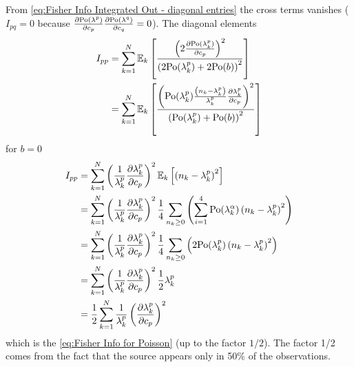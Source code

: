 From \autoref{eq:Fisher Info Integrated Out - diagonal entries} the cross terms vanishes ($I_{pq}=0$ because $\frac{\partial\mathrm{Po}(\lambda^p)}{\partial c_p}\frac{\partial\mathrm{Po}(\lambda^q)}{\partial c_{q}}=0$). The diagonal elements 
%
\begin{alignat*}{1}
	I_{pp} & =\sum_{k=1}^N\mathbb{E}_k\left[\frac{\left(2\frac{\partial\mathrm{Po}(\lambda_k^p)}{\partial c_p}\right)^2}{\left(2\mathrm{Po}(\lambda_k^p)+2\mathrm{Po}(b)\right)^2}\right]\\
 	& =\sum_{k=1}^N\mathbb{E}_k\left[\frac{\left(\mathrm{Po}(\lambda_k^p)\frac{\left(n_k-\lambda_k^p\right)}{\lambda_k^p}\frac{\partial\lambda_k^p}{\partial c_p}\right)^2}{\left(\mathrm{Po}(\lambda_k^p)+\mathrm{Po}(b)\right)^2}\right]
\end{alignat*}
%
for $b=0$
%
\begin{alignat*}{1}
	I_{pp} 
	 &=\sum_{k=1}^N\left(\frac{1}{\lambda_k^p}\frac{\partial\lambda_k^p}{\partial c_p}\right)^2\mathbb{E}_k\left[\left(n_k-\lambda_k^p\right)^2\right]\\
 	& =\sum_{k=1}^N\left(\frac{1}{\lambda_k^p}\frac{\partial\lambda_k^p}{\partial c_p}\right)^2\frac{1}{4}\sum_{n_k\geq0}\left(\sum_{i=1}^4\mathrm{Po}(\lambda_k^\alpha)\left(n_k-\lambda_k^p\right)^2\right)\\
 	& =\sum_{k=1}^N\left(\frac{1}{\lambda_k^p}\frac{\partial\lambda_k^p}{\partial c_p}\right)^2\frac{1}{4}\sum_{n_k\geq0}\left(2\mathrm{Po}(\lambda_k^p)\left(n_k-\lambda_k^p\right)^2\right)\\
 	& =\sum_{k=1}^N\left(\frac{1}{\lambda_k^p}\frac{\partial\lambda_k^p}{\partial c_p}\right)^2\frac{1}{2}\lambda_k^p\\
 	& =\frac{1}{2}\sum_{k=1}^N\frac{1}{\lambda_k^p}\left(\frac{\partial\lambda_k^p}{\partial c_p}\right)^2
\end{alignat*}
%
which is the \autoref{eq:Fisher Info for Poisson} (up to the factor $1/2$). The factor 1/2 comes from the fact that the source appears only in 50\% of the observations.

